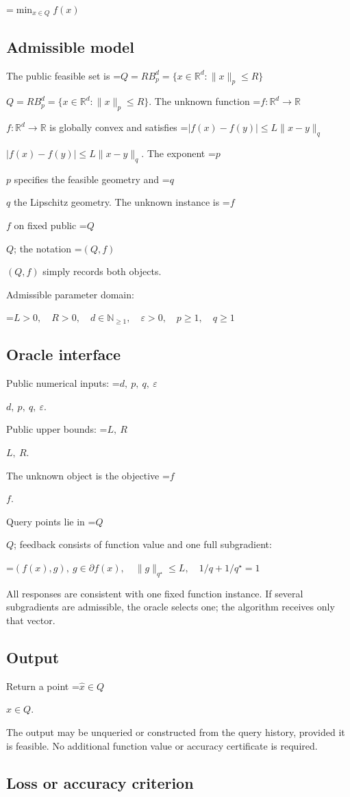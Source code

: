 \documentclass[10pt,a4paper]{article}
\newcommand{\AtlasMath}[1]{\par\begingroup\centering\setbox0=\hbox{$\displaystyle #1$}\ifdim\wd0>1.4\linewidth\typeout{ATLAS WIDE FORMULA: \the\wd0}\fi\ifdim\wd0>\linewidth\resizebox{\linewidth}{!}{\box0}\else\box0\fi\par\endgroup}
\newcommand{\AtlasInlineMath}[1]{\begingroup\setbox0=\hbox{$#1$}\ifdim\wd0>.4\linewidth\endgroup\AtlasMath{#1}\else\endgroup$#1$\fi}
\begin{document}
\AtlasMath{\min_{x\in Q}f(x)}


\subsection{Admissible model}
The public feasible set is \AtlasInlineMath{Q=RB_p^d=\{x\in\mathbb R^d:\|x\|_p\le R\}}. The unknown function \AtlasInlineMath{f:\mathbb R^d\to\mathbb R} is globally convex and satisfies \AtlasInlineMath{|f(x)-f(y)|\le L\|x-y\|_q}. The exponent \AtlasInlineMath{p} specifies the feasible geometry and \AtlasInlineMath{q} the Lipschitz geometry. The unknown instance is \AtlasInlineMath{f} on fixed public \AtlasInlineMath{Q}; the notation \AtlasInlineMath{(Q,f)} simply records both objects.

Admissible parameter domain:


\AtlasMath{L>0,\quad R>0,\quad d\in\mathbb{N}_{\ge1},\quad \varepsilon>0,\quad p\ge1,\quad q\ge1}


\subsection{Oracle interface}
Public numerical inputs: \AtlasInlineMath{d,\ p,\ q,\ \varepsilon}.

Public upper bounds: \AtlasInlineMath{L,\ R}.

The unknown object is the objective \AtlasInlineMath{f}.

Query points lie in \AtlasInlineMath{Q}; feedback consists of function value and one full subgradient:


\AtlasMath{(f(x),g),\ g\in\partial f(x),\quad\|g\|_{q^\star}\le L,\quad1/q+1/q^\star=1}


All responses are consistent with one fixed function instance. If several subgradients are admissible, the oracle selects one; the algorithm receives only that vector.

\subsection{Output}
Return a point \AtlasInlineMath{\widehat x\in Q}.

The output may be unqueried or constructed from the query history, provided it is feasible. No additional function value or accuracy certificate is required.

\subsection{Loss or accuracy criterion}
\end{document}
